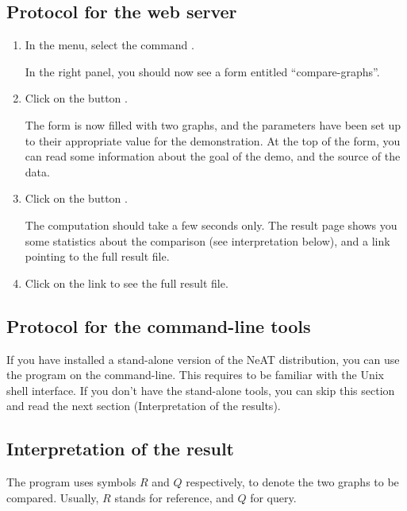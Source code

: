 \subsection{Protocol for the web server}

\begin{enumerate}

\item In the \neat menu, select the command . 

  In the right panel, you should now see a form entitled
  ``compare-graphs''.

\item Click on the button . 

  The form is now filled with two graphs, and the parameters have been
  set up to their appropriate value for the demonstration. At the top
  of the form, you can read some information about the goal of the
  demo, and the source of the data.

\item Click on the button . 

  The computation should take a few seconds only. The result page
  shows you some statistics about the comparison (see interpretation
  below), and a link pointing to the full result file. 

\item Click on the link to see the full result file. 


\end{enumerate}

\subsection{Protocol for the command-line tools}

If you have installed a stand-alone version of the NeAT distribution,
you can use the program  on the
command-line. This requires to be familiar with the Unix shell
interface. If you don't have the stand-alone tools, you can skip this
section and read the next section (Interpretation of the results).


\subsection{Interpretation of the result}

The program  uses symbols $R$ and $Q$
respectively, to denote the two graphs to be compared. Usually, $R$
stands for reference, and $Q$ for query. 

